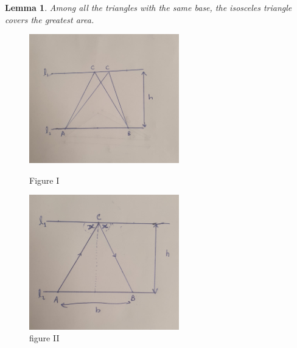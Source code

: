 \documentclass[a4paper]{book}
\newtheorem{lemma}[theorem]{Lemma}%
\begin{document}
\begin{lemma} 
    Among all the triangles with the same base, the isosceles triangle covers the greatest area.
\end{lemma}
\begin{figure}[h]
	\centering
	\begin{minipage}{0.5\textwidth}
		\centering
        		\includegraphics[width=65mm]{isofig5.png} %
        		\caption{Figure I}
	\end{minipage}\hfill
    	\begin{minipage}{0.5\textwidth}
		\centering
		\includegraphics[width=65mm]{isofig6.png} %
		\caption{figure II}
	\end{minipage}
\end{figure}
\end{document}
